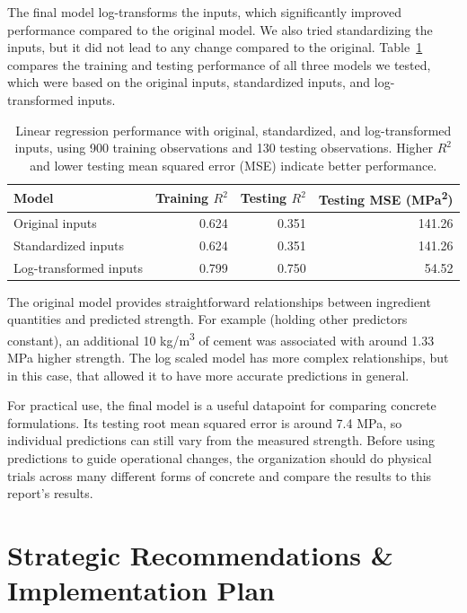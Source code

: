 \documentclass[12pt,letterpaper]{article}
\begin{document}
The final model log-transforms the inputs, which significantly improved performance compared to the original model. We also tried standardizing the inputs, but it did not lead to any change compared to the original. Table~\ref{tab:model-performance} compares the training and testing performance of all three models we tested, which were based on the original inputs, standardized inputs, and log-transformed inputs.

\begin{table}[H]
    \centering
    \caption{Linear regression performance with original, standardized, and log-transformed inputs, using 900 training observations and 130 testing observations. Higher $R^2$ and lower testing mean squared error (MSE) indicate better performance.}
    \label{tab:model-performance}
    \begin{tabular}{lrrr}
        \toprule
        \textbf{Model} & \textbf{Training $R^2$} & \textbf{Testing $R^2$} & \textbf{Testing MSE (MPa\textsuperscript{2})} \\
        \midrule
        Original inputs & 0.624 & 0.351 & 141.26 \\
        Standardized inputs & 0.624 & 0.351 & 141.26 \\
        Log-transformed inputs & 0.799 & 0.750 & 54.52 \\
        \bottomrule
    \end{tabular}
\end{table}

The original model provides straightforward relationships between ingredient quantities and predicted strength. For example (holding other predictors constant), an additional 10 kg/m\textsuperscript{3} of cement was associated with around 1.33 MPa higher strength. The log scaled model has more complex relationships, but in this case, that allowed it to have more accurate predictions in general.

For practical use, the final model is a useful datapoint for comparing concrete formulations. Its testing root mean squared error is around 7.4 MPa, so individual predictions can still vary from the measured strength. Before using predictions to guide operational changes, the organization should do physical trials across many different forms of concrete and compare the results to this report's results.

\newpage

\section{Strategic Recommendations \& Implementation Plan}
\end{document}
